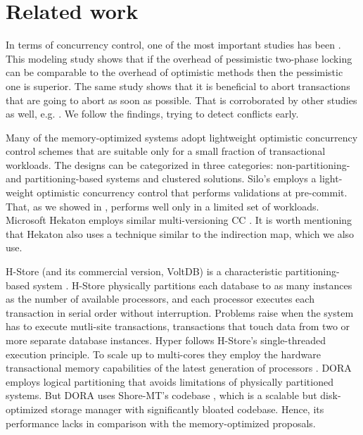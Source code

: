 
\section{Related work}

In terms of concurrency control, one of the most important studies has been \cite{AgrawalCL87}. This modeling study shows that if the overhead of pessimistic two-phase locking can be comparable to the overhead of optimistic methods then the pessimistic one is superior. The same study shows that it is beneficial to abort transactions that are going to abort as soon as possible. That is corroborated by other studies as well, e.g. \cite{PortsG12}. We follow the findings, trying to detect conflicts early.

Many of the memory-optimized systems adopt lightweight optimistic concurrency control schemes that are suitable only for a small fraction of transactional workloads.
The designs can be categorized in three categories: non-partitioning- and partitioning-based systems and clustered solutions. 
Silo's  \cite{TuZKLM13} employs a light-weight optimistic concurrency control that performs validations at pre-commit. That, as we showed in , performs well only in a limited set of workloads. 
Microsoft Hekaton \cite{Diaconu+13} employs similar multi-versioning CC \cite{LarsonBDFPZ11}. It is worth mentioning that Hekaton also uses a technique similar to the indirection map, which we also use. 

H-Store (and its commercial version, VoltDB) is a characteristic partitioning-based system \cite{Kallman+08}. H-Store physically partitions each database to as many instances as the number of available processors, and each processor executes each transaction in serial order without interruption.  
Problems raise when the system has to execute mutli-site transactions, transactions that touch data from two or more separate database instances. 
Hyper \cite{KemperN11} follows H-Store's single-threaded execution principle.  To scale up to multi-cores they employ the hardware transactional memory capabilities of the latest generation of processors \cite{LeisKN14}. 
DORA \cite{PandisJHA10} employs logical partitioning that avoids limitations of physically partitioned systems. But DORA uses Shore-MT's codebase \cite{JohnsonPHAF09}, which is a scalable but disk-optimized storage manager with significantly bloated codebase. Hence, its performance lacks in comparison with the memory-optimized proposals.
